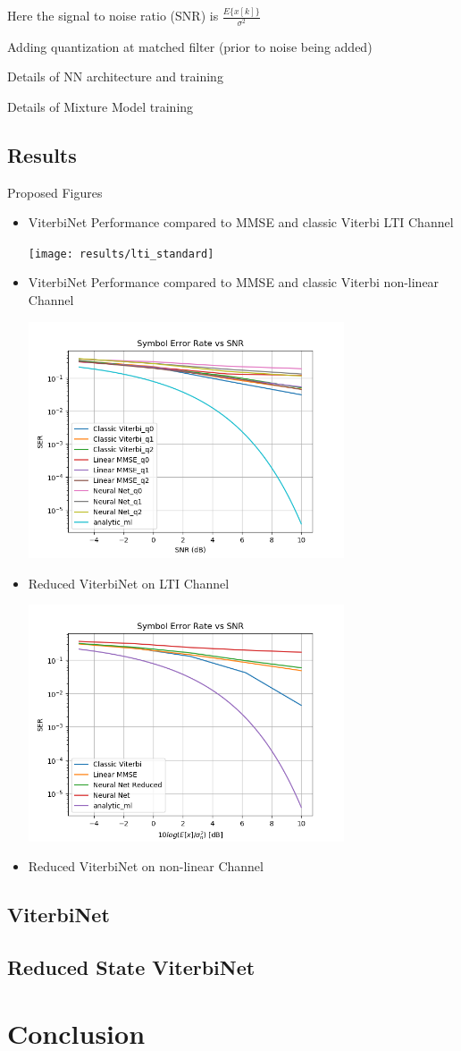 \documentclass[12pt,a4paper]{report}
\begin{document}
Here the signal to noise ratio (SNR) is 
$\frac{E\{x[k]\}}{\sigma^2}$

Adding quantization at matched filter (prior to noise being added)


Details of NN architecture and training

Details of Mixture Model training

\subsection{Results}
Proposed Figures
\begin{itemize}
\item ViterbiNet Performance compared to MMSE and classic Viterbi LTI Channel

	\texttt{[image: results/lti\_standard]}

\item ViterbiNet Performance compared to MMSE and classic Viterbi non-linear Channel

	\includegraphics[width=\textwidth,height = 7cm]{results/quant_standard}

\item Reduced ViterbiNet on LTI Channel

	\includegraphics[width=\textwidth,height = 7cm]{results/lti_reduced}

\item Reduced ViterbiNet on non-linear Channel

\end{itemize}
\subsection*{ViterbiNet}
\subsection*{Reduced State ViterbiNet}
\section{Conclusion}

\newpage

\end{document}
